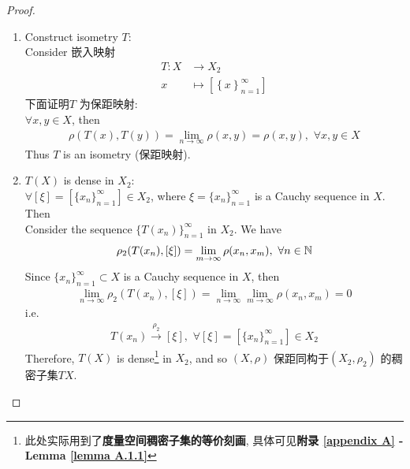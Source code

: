 \begin{thm}
\begin{proof}
\begin{enumerate}
				\vspace{8em}
				
				\item Construct isometry $T$: \\
				Consider 嵌入映射
				\begin{align}
					T : X &\rightarrow X_2 \\
					x &\longmapsto [\left\{ x \right\}_{n = 1}^{\infty}]
				\end{align}
				下面证明$T$ 为保距映射: \\
				$\forall x , y \in X$, then
				\begin{align}
					\rho(T(x) , T(y)) = \lim_{n \to \infty}{\rho(x , y)} = \rho(x , y) , \,\, \forall x,  y \in X
				\end{align}
				Thus $T$ is an isometry (保距映射).
				
				\newpage
				
				\item $T(X)$ is dense in $X_2$: \\
				$\forall [\xi] = [\{ x_n \}_{n = 1}^{\infty}] \in X_2$, where $\xi = \{ x_n \}_{n = 1}^{\infty}$ is a Cauchy sequence in $X$. Then \\
				Consider the sequence $\{ T(x_n) \}_{n = 1}^{\infty}$ in $X_2$. We have
				\begin{align}
					\rho_2(T(x_n) , [\xi]) = \lim_{m \to \infty}{\rho(x_n , x_m)} , \,\, \forall n \in \mathbb{N}
				\end{align}
				Since $\{ x_n \}_{n = 1}^{\infty} \subset X$ is a Cauchy sequence in $X$, then
				\begin{align}
					\lim_{n \to \infty}{\rho_2(T(x_n) , [\xi])} 
					= \lim_{n \to \infty} \lim_{m \to \infty}{\rho(x_n , x_m)} 
					= 0
				\end{align}
				i.e.
				\begin{align}
					T(x_n) \overset{\rho_2}{\to} [\xi] , \,\, \forall [\xi] = [\{ x_n \}_{n = 1}^{\infty}] \in X_2
				\end{align}
				Therefore, $T(X)$ is dense\footnote{此处实际用到了\textbf{度量空间稠密子集的等价刻画}, 具体可见\textbf{附录 \ref{appendix A} - Lemma \ref{lemma A.1.1}}} in $X_2$, and so $(X , \rho)$ 保距同构于$(X_2 , \rho_2)$ 的稠密子集$TX$.
				
				\vspace{6em}
				

\end{enumerate}
\end{proof}
\end{thm}

